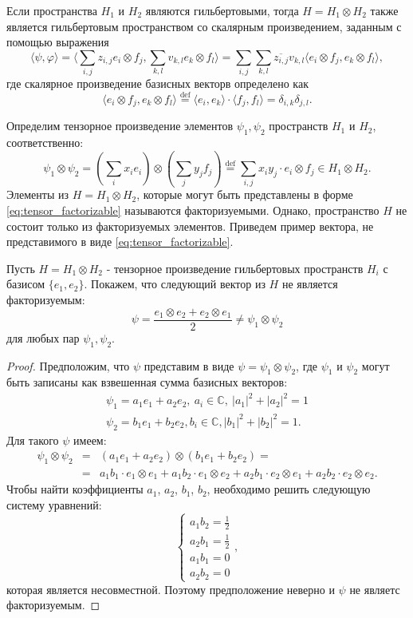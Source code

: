 \documentclass[11pt]{article}
\begin{document}
Если пространства $H_1$ и $H_2$ являются гильбертовыми, тогда $H = H_1\otimes H_2$ также является гильбертовым пространством со скалярным произведением, заданным с помощью выражения
\[
\langle\psi, \varphi\rangle = \langle \sum_{i,j}z_{i,j}e_i\otimes f_j, \sum_{k,l}v_{k,l}e_k\otimes f_l \rangle = \sum_{i, j}\sum_{k, l}\overline{z_{i,j}}v_{k,l} \langle e_i\otimes f_j, e_k\otimes f_l \rangle,
\]
где скалярное произведение базисных векторв определено как
\[
\langle e_i\otimes f_j, e_k\otimes f_l \rangle \overset{\mbox{def}}= \langle e_i, e_k\rangle \cdot \langle f_j, f_l \rangle = \delta_{i, k}\delta_{j, l}.
\]

Определим тензорное произведение элементов $\psi_1, \psi_2$ пространств $H_1$ и $H_2$, соответственно:
\begin{equation}
\psi_1 \otimes \psi_2 = \left(\sum_ix_ie_i\right) \otimes \left(\sum_jy_jf_j\right) \overset{\mbox{def}}= \sum_{i, j} x_iy_j \cdot e_i \otimes f_j \in H_1 \otimes H_2.
\label{eq:tensor_factorizable}
\end{equation}
Элементы из $H = H_1\otimes H_2$, которые могут быть представлены в форме \eqref{eq:tensor_factorizable} называются факторизуемыми. Однако, пространство $H$ не состоит только из факторизуемых элементов. Приведем пример вектора, не представимого в виде \eqref{eq:tensor_factorizable}.

Пусть $H = H_1\otimes H_2$ - тензорное произведение гильбертовых пространств $H_i$ с базисом $\{e_1, e_2\}$. Покажем, что следующий вектор из $H$ не является факторизуемым: 
\[
	\psi = \frac{e_1 \otimes e_2 + e_2 \otimes e_1}{2} \ne \psi_1 \otimes \psi_2
\]
для любых пар $\psi_1, \psi_2$.
\begin{proof}
Предположим, что $\psi$ представим в виде $\psi = \psi_1\otimes\psi_2$, где 
$\psi_1$ и $\psi_2$ могут быть записаны как взвешенная сумма базисных векторов:
\begin{gather*}
	\psi_1 = a_1 e_1 + a_2 e_2,\ a_i\in \mathbb{C},\ |a_1|^2 + |a_2|^2 = 1 \\
	\psi_2 = b_1 e_1 + b_2 e_2, b_i\in \mathbb{C}, |b_1|^2 + |b_2|^2 = 1.
\end{gather*}
Для такого $\psi$ имеем:
\begin{eqnarray*}
	\psi_1 \otimes \psi_2 &=& (a_1 e_1 + a_2 e_2) \otimes (b_1 e_1 + b_2 e_2) = \\ &=&  
	a_1 b_1 \cdot e_1 \otimes e_1 + a_1 b_2 \cdot e_1 \otimes e_2 + 
	a_2 b_1 \cdot e_2 \otimes e_1 + a_2 b_2 \cdot e_2 \otimes e_2.
\end{eqnarray*}
Чтобы найти коэффициенты $a_1$, $a_2$, $b_1$, $b_2$, необходимо решить следующую систему уравнений:
$$
\begin{cases}
a_1 b_2 = \frac12 \\
a_2 b_1 = \frac12 \\
a_1 b_1 = 0 \\
a_2 b_2 = 0
\end{cases},
$$
которая является несовместной. Поэтому предположение неверно и $\psi$ не являетс факторизуемым.
\end{proof}
 
\end{document}
